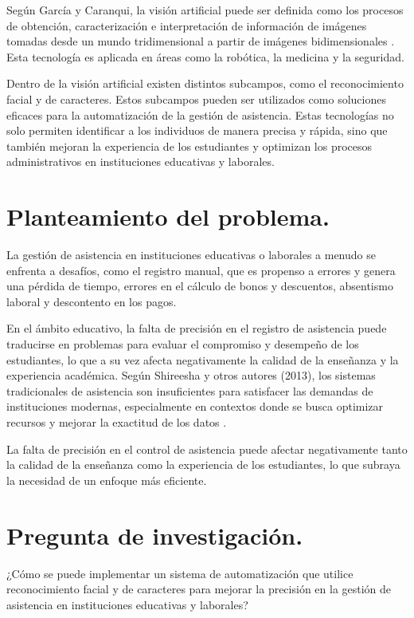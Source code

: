 \documentclass[12pt, letterpaper]{article}
\begin{document}
Según García y Caranqui, la visión artificial puede ser definida como los procesos de obtención, caracterización e interpretación  de información  de  imágenes  tomadas  desde  un  mundo  tridimensional a  partir  de imágenes bidimensionales \cite{b3}. Esta tecnología es aplicada en áreas como la robótica, la medicina y la seguridad.

Dentro de la visión artificial existen distintos subcampos, como el reconocimiento facial y de caracteres. Estos subcampos pueden ser utilizados como soluciones eficaces para la automatización de la gestión de asistencia. Estas tecnologías no solo permiten identificar a los individuos de manera precisa y rápida, sino que también mejoran la experiencia de los estudiantes y optimizan los procesos administrativos en instituciones educativas y laborales.

\section{Planteamiento del problema.}
La gestión de asistencia en instituciones educativas o laborales a menudo se enfrenta a desafíos, como el registro manual, que es propenso a errores y genera una pérdida de tiempo, errores en el cálculo de bonos y descuentos, absentismo laboral y descontento en los pagos. 

En el ámbito educativo, la falta de precisión en el registro de asistencia puede traducirse en problemas para evaluar el compromiso y desempeño de los estudiantes, lo que a su vez afecta negativamente la calidad de la enseñanza y la experiencia académica. Según Shireesha y otros autores (2013), los sistemas tradicionales de asistencia son insuficientes para satisfacer las demandas de instituciones modernas, especialmente en contextos donde se busca optimizar recursos y mejorar la exactitud de los datos \cite{b16}.

La falta de precisión en el control de asistencia puede afectar negativamente tanto la calidad de la enseñanza como la experiencia de los estudiantes, lo que subraya la necesidad de un enfoque más eficiente.


\section{Pregunta de investigación.}
¿Cómo se puede implementar un sistema de automatización que utilice reconocimiento facial y de caracteres para mejorar la precisión en la gestión de asistencia en instituciones educativas y laborales?
\end{document}
